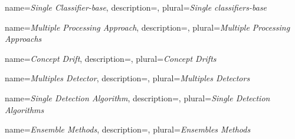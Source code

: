 {
  name=\textit{Single Classifier-base},
  description={},
  plural=\textit{Single classifiers-base}
}

{
  name=\textit{Multiple Processing Approach},
  description={},
  plural=\textit{Multiple Processing Approachs}
}

{
  name=\textit{Concept Drift},
  description={},
  plural=\textit{Concept Drifts}
}


{
  name=\textit{Multiples Detector},
  description={},
  plural=\textit{Multiples Detectors}
}

{
  name=\textit{Single Detection Algorithm},
  description={},
  plural=\textit{Single Detection Algorithms}
}

{
  name=\textit{Ensemble Methods},
  description={},
  plural=\textit{Ensembles Methods}
}



